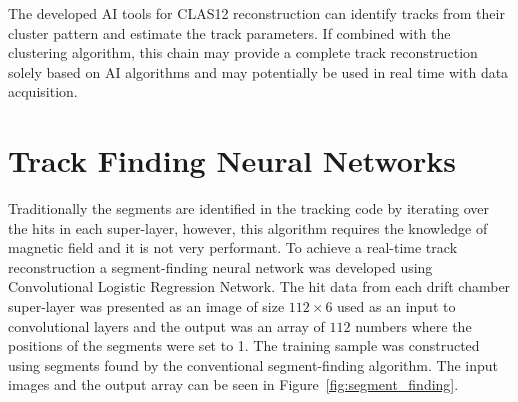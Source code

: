 \documentclass[preprint,12pt]{elsarticle}
\begin{document}
The developed AI tools for CLAS12 reconstruction can identify tracks from their cluster pattern and estimate the track parameters.
If combined with the clustering algorithm, this chain may provide a complete track reconstruction solely based on AI algorithms and
may potentially be used in real time with data acquisition. 

\section{Track Finding Neural Networks}

Traditionally the segments are identified in the tracking code by iterating over the hits in each super-layer, however, this algorithm requires the knowledge of magnetic field and it is not very performant. To achieve a real-time track reconstruction a segment-finding neural network was developed using Convolutional Logistic Regression Network.
The hit data from each drift chamber super-layer was presented as an image of size $112\times6$ used as an input to convolutional layers and the output was an array of $112$ numbers where the positions of the segments were set to 1.  The training sample was constructed using segments found by the conventional segment-finding algorithm. The input images and the output array can be seen in Figure~\ref{fig:segment_finding}. 
\end{document}
